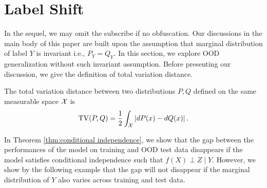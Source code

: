 \section{Label Shift}\label{subsec: label shift}
In the sequel, we may omit the subscribe if no obfuscation. Our discussions in the main body of this paper are built upon the assumption that marginal distribution of label $Y$ is invariant i.e., $P_{Y} = Q_{Y}$. In this section, we explore OOD generalization without such invariant assumption. Before presenting our discussion, we give the definition of total variation distance. 
\begin{definition}
	The total variation distance between two distributions $P, Q$ defined on the same measurable space $\mathcal{X}$ is 
	\begin{equation}
		\small
		\mathrm{TV}(P, Q) = \frac{1}{2}\int_{\cX}\left|dP(x) - dQ(x)\right|. 
	\end{equation}
\end{definition}
In Theorem \ref{thm:conditional independence}, we show that the gap between the performances of the model on training and OOD test data disappears if the model satisfies conditional independence such that $f(X)\perp Z\mid Y$. However, we show by the following example that the gap will not disappear if the marginal distribution of $Y$ also varies across training and test data. 
